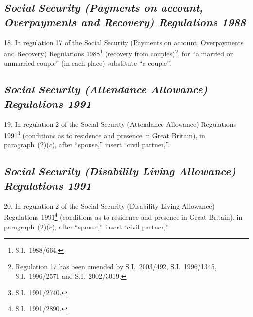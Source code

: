\documentclass[12pt,a4paper]{article}
\begin{document}
\subsection*{\itshape Social Security (Payments on account, Overpayments and Recovery) Regulations 1988}

18.  In regulation 17 of the Social Security (Payments on account, Overpayments and Recovery) Regulations 1988\footnote{S.I.\ 1988/664.} (recovery from couples)\footnote{Regulation 17 has been amended by S.I.\ 2003/492, S.I.\ 1996/1345, S.I.\ 1996/2571 and S.I.\ 2002/3019.}, for “a married or unmarried couple” (in each place) substitute “a couple”.

\subsection*{\itshape\sloppy Social Security (Attendance Allowance) Regulations 1991}

19.  In regulation 2 of the Social Security (Attendance Allowance) Regulations 1991\footnote{S.I.\ 1991/2740.} (conditions as to residence and presence in Great Britain), in paragraph~(2)($c$), after “spouse,” insert “civil partner,”.

\subsection*{\itshape Social Security (Disability Living Allowance) Regulations 1991}

20.  In regulation 2 of the Social Security (Disability Living Allowance) Regulations 1991\footnote{S.I.\ 1991/2890.} (conditions as to residence and presence in Great Britain), in paragraph~(2)($c$), after “spouse,” insert “civil partner,”.

\end{document}
